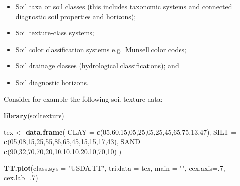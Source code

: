 \documentclass[10pt,b5paper,]{book}
\newenvironment{Shaded}{\begin{snugshade}}{\end{snugshade}}
\newcommand{\DataTypeTok}[1]{\textcolor[rgb]{0.13,0.29,0.53}{#1}}
\newcommand{\DecValTok}[1]{\textcolor[rgb]{0.00,0.00,0.81}{#1}}
\newcommand{\KeywordTok}[1]{\textcolor[rgb]{0.13,0.29,0.53}{\textbf{#1}}}
\newcommand{\NormalTok}[1]{#1}
\newcommand{\StringTok}[1]{\textcolor[rgb]{0.31,0.60,0.02}{#1}}
\providecommand{\tightlist}{%
  \setlength{\itemsep}{0pt}\setlength{\parskip}{0pt}}
\theoremstyle{definition}
\theoremstyle{definition}
\theoremstyle{definition}
\theoremstyle{remark}
\begin{document}
\begin{itemize}
\tightlist
\item
  Soil taxa or soil classes (this includes taxonomic systems and
  connected diagnostic soil properties and horizons);
\item
  Soil texture-class systems;
\item
  Soil color classification systems e.g.~Munsell color codes;
\item
  Soil drainage classes (hydrological classifications); and
\item
  Soil diagnostic horizons.
\end{itemize}

Consider for example the following soil texture data:

\begin{Shaded}
\begin{Highlighting}[]
\KeywordTok{library}\NormalTok{(soiltexture)}

\NormalTok{tex <-}\StringTok{ }\KeywordTok{data.frame}\NormalTok{(}
  \DataTypeTok{CLAY =} \KeywordTok{c}\NormalTok{(}\DecValTok{05}\NormalTok{,}\DecValTok{60}\NormalTok{,}\DecValTok{15}\NormalTok{,}\DecValTok{05}\NormalTok{,}\DecValTok{25}\NormalTok{,}\DecValTok{05}\NormalTok{,}\DecValTok{25}\NormalTok{,}\DecValTok{45}\NormalTok{,}\DecValTok{65}\NormalTok{,}\DecValTok{75}\NormalTok{,}\DecValTok{13}\NormalTok{,}\DecValTok{47}\NormalTok{),}
  \DataTypeTok{SILT =} \KeywordTok{c}\NormalTok{(}\DecValTok{05}\NormalTok{,}\DecValTok{08}\NormalTok{,}\DecValTok{15}\NormalTok{,}\DecValTok{25}\NormalTok{,}\DecValTok{55}\NormalTok{,}\DecValTok{85}\NormalTok{,}\DecValTok{65}\NormalTok{,}\DecValTok{45}\NormalTok{,}\DecValTok{15}\NormalTok{,}\DecValTok{15}\NormalTok{,}\DecValTok{17}\NormalTok{,}\DecValTok{43}\NormalTok{),}
  \DataTypeTok{SAND =} \KeywordTok{c}\NormalTok{(}\DecValTok{90}\NormalTok{,}\DecValTok{32}\NormalTok{,}\DecValTok{70}\NormalTok{,}\DecValTok{70}\NormalTok{,}\DecValTok{20}\NormalTok{,}\DecValTok{10}\NormalTok{,}\DecValTok{10}\NormalTok{,}\DecValTok{10}\NormalTok{,}\DecValTok{20}\NormalTok{,}\DecValTok{10}\NormalTok{,}\DecValTok{70}\NormalTok{,}\DecValTok{10}\NormalTok{)}
\NormalTok{ )}
 
\KeywordTok{TT.plot}\NormalTok{(}\DataTypeTok{class.sys =} \StringTok{"USDA.TT"}\NormalTok{, }\DataTypeTok{tri.data =}\NormalTok{ tex, }\DataTypeTok{main =} \StringTok{""}\NormalTok{, }
        \DataTypeTok{cex.axis=}\NormalTok{.}\DecValTok{7}\NormalTok{, }\DataTypeTok{cex.lab=}\NormalTok{.}\DecValTok{7}\NormalTok{)}
\end{Highlighting}
\end{Shaded}
\end{document}
